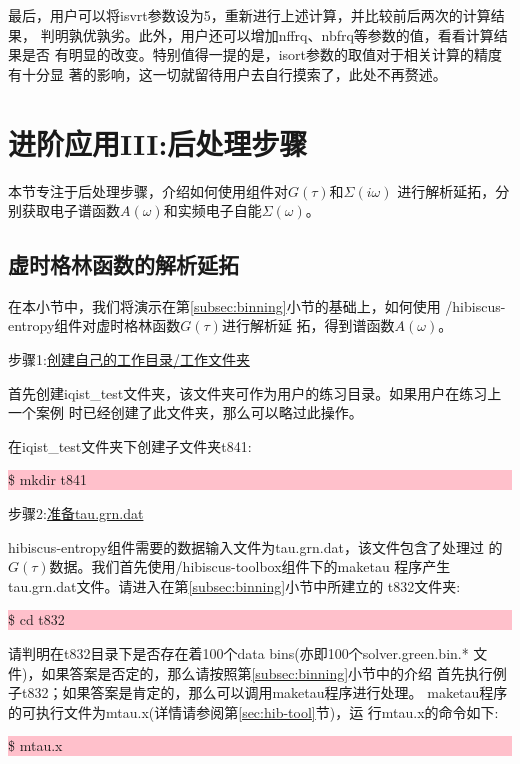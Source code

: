 最后，用户可以将isvrt参数设为5，重新进行上述计算，并比较前后两次的计算结果，
判明孰优孰劣。此外，用户还可以增加nffrq、nbfrq等参数的值，看看计算结果是否
有明显的改变。特别值得一提的是，isort参数的取值对于相关计算的精度有十分显
著的影响，这一切就留待用户去自行摸索了，此处不再赘述。

\section{进阶应用III:后处理步骤}
\label{sec:stage3}

本节专注于后处理步骤，介绍如何使用{\hibiscus}组件对$G(\tau)$和$\Sigma(i\omega)$
进行解析延拓，分别获取电子谱函数$A(\omega)$和实频电子自能$\Sigma(\omega)$。

\subsection{虚时格林函数的解析延拓}
\label{subsec:ac-g}

在本小节中，我们将演示在第\ref{subsec:binning}小节的基础上，如何使用
{\hibiscus}/hibiscus-entropy组件对虚时格林函数$G(\tau)$进行解析延
拓，得到谱函数$A(\omega)$。

步骤1:\underline{创建自己的工作目录/工作文件夹}

首先创建iqist\_test文件夹，该文件夹可作为用户的练习目录。如果用户在练习上一个案例
时已经创建了此文件夹，那么可以略过此操作。

在iqist\_test文件夹下创建子文件夹t841:

\noindent\colorbox{pink}{\parbox[r]{\linewidth}{\quad \$ mkdir t841 }}

步骤2:\underline{准备tau.grn.dat}

hibiscus-entropy组件需要的数据输入文件为tau.grn.dat，该文件包含了处理过
的$G(\tau)$数据。我们首先使用{\hibiscus}/hibiscus-toolbox组件下的maketau
程序产生tau.grn.dat文件。请进入在第\ref{subsec:binning}小节中所建立的
t832文件夹:

\noindent\colorbox{pink}{\parbox[r]{\linewidth}{\quad \$ cd t832 }}

请判明在t832目录下是否存在着100个data bins(亦即100个solver.green.bin.*
文件)，如果答案是否定的，那么请按照第\ref{subsec:binning}小节中的介绍
首先执行例子t832；如果答案是肯定的，那么可以调用maketau程序进行处理。
maketau程序的可执行文件为mtau.x(详情请参阅第\ref{sec:hib-tool}节)，运
行mtau.x的命令如下:

\noindent\colorbox{pink}{\parbox[r]{\linewidth}{\quad \$ mtau.x }}

